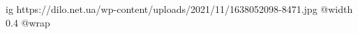  
 
 
 
 

\ifcmt
  ig https://dilo.net.ua/wp-content/uploads/2021/11/1638052098-8471.jpg
  @width 0.4
  @wrap 
\fi
